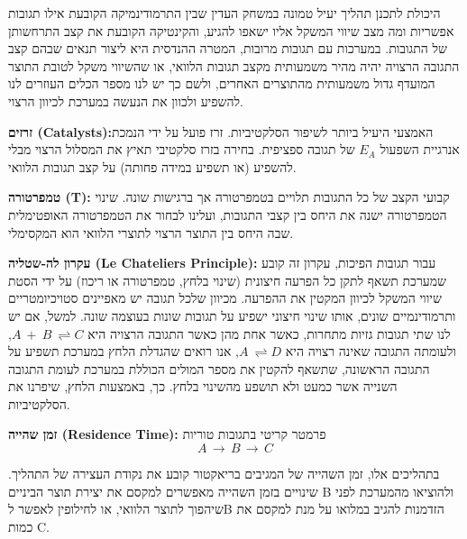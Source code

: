 \documentclass[
  hebrew,
  letterpaper,
  DIV=11,
  numbers=noendperiod]{scrreprt}
\begin{document}
\begin{tcolorbox}[enhanced jigsaw, colback=white, arc=.35mm, coltitle=black, breakable, toptitle=1mm, leftrule=.75mm, colbacktitle=quarto-callout-tip-color!10!white, opacitybacktitle=0.6, bottomtitle=1mm, titlerule=0mm, opacityback=0, colframe=quarto-callout-tip-color-frame, title=\textcolor{quarto-callout-tip-color}{\faLightbulb}\hspace{0.5em}{עצה}, rightrule=.15mm, bottomrule=.15mm, toprule=.15mm, left=2mm]

היכולת לתכנן תהליך יעיל טמונה במשחק העדין שבין התרמודינמיקה הקובעת אילו
תגובות אפשריות ומה מצב שיווי המשקל אליו ישאפו להגיע, והקינטיקה הקובעת את
קצב התרחשותן של התגובות. במערכות עם תגובות מרובות, המטרה ההנדסית היא
ליצור תנאים שבהם קצב התגובה הרצויה יהיה מהיר משמעותית מקצב תגובות
הלוואי, או שהשיווי משקל לטובת התוצר המועדף גדול משמעותית מהתוצרים
האחרים, ולשם כך יש לנו מספר הכלים העוזרים לנו להשפיע ולכוון את הנעשה
במערכת לכיוון הרצוי.

\textbf{זרזים (Catalysts):}האמצעי היעיל ביותר לשיפור הסלקטיביות. זרז
פועל על ידי הנמכת אנרגיית השפעול \(E_{A}\) של תגובה ספציפית. בחירה בזרז
סלקטיבי תאיץ את המסלול הרצוי מבלי להשפיע (או תשפיע במידה פחותה) על קצב
תגובות הלוואי.

\textbf{טמפרטורה (T):} קבועי הקצב של כל התגובות תלויים בטמפרטורה אך
ברגישות שונה. שינוי הטמפרטורה ישנה את היחס בין קצבי התגובות, ועלינו
לבחור את הטמפרטורה האופטימלית שבה היחס בין התוצר הרצוי לתוצרי הלוואי הוא
המקסימלי.

\textbf{עקרון לה-שטליה (Le Chatelier\textquotesingle s Principle):} עבור
תגובות הפיכות, עקרון זה קובע שמערכת תשאף
\textquotesingle לתקן\textquotesingle{} כל הפרעה חיצונית (שינוי בלחץ,
טמפרטורה או ריכוז) על ידי הסטת שיווי המשקל לכיוון המקטין את ההפרעה.
מכיוון שלכל תגובה יש מאפיינים סטויכיומטריים ותרמודינמיים שונים, אותו
שינוי חיצוני ישפיע על תגובות שונות בעוצמה שונה. למשל, אם יש לנו שתי
תגובות גזיות מתחרות, כאשר אחת מהן כאשר התגובה הרצויה היא
\(A\  + \ B\  \rightleftharpoons C\), ולעומתה התגובה שאינה רצויה היא
\(A\  \rightleftharpoons D\), אנו רואים שהגדלת הלחץ במערכת תשפיע על
התגובה הראשונה, שתשאף להקטין את מספר המולים הכוללת במערכת לעומת התגובה
השנייה אשר כמעט ולא תושפע מהשינוי בלחץ. כך, באמצעות הלחץ, שיפרנו את
הסלקטיביות.

\textbf{זמן שהייה (Residence Time):} פרמטר קריטי בתגובות טוריות\\
\[A\, \rightarrow \, B\, \rightarrow \, C\]

בתהליכים אלו, זמן השהייה של המגיבים בריאקטור קובע את נקודת העצירה של
התהליך. שינויים בזמן השהייה מאפשרים למקסם את יצירת תוצר הביניים B
ולהוציאו מהמערכת לפני שיהפוך לתוצר הלוואי, או לחילופין לאפשר לB הזדמנות
להגיב במלואו על מנת למקסם את כמות C.

\end{tcolorbox}
\end{document}
